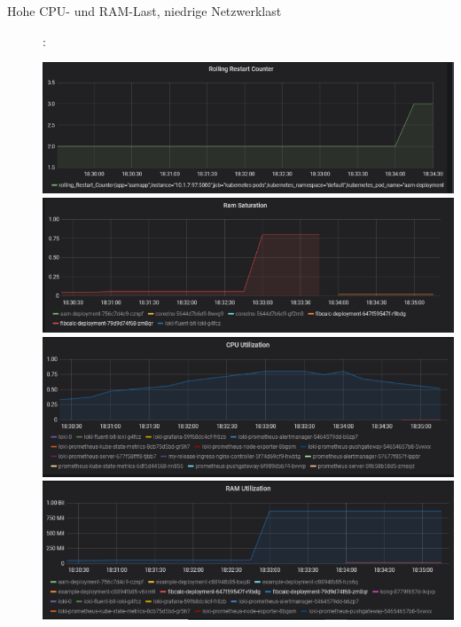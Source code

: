 \documentclass[a4paper,10pt]{scrartcl}
\begin{document}
\begin{description}
\item[Hohe CPU- und RAM-Last, niedrige Netzwerklast]:\\

\begin{minipage}{\linewidth}
            \includegraphics[width=1\textwidth]{img/RAMCPUAnomalie/RollingRestart.PNG}\\
            
            \includegraphics[width=1\textwidth,height=.14\textheight]{img/RAMCPUAnomalie/RAMSaturation.PNG}\\
            
  			\includegraphics[width=1\textwidth]{img/RAMCPUAnomalie/CPUUtilization.PNG}\\
  			
  			\includegraphics[width=1\textwidth]{img/RAMCPUAnomalie/RAMUtilization.PNG}
\end{minipage}	
\begin{minipage}{\linewidth}	


\end{minipage}
\end{description}
\end{document}
